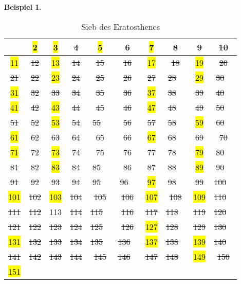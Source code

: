 \documentclass[12pt,a4paper]{article}
\theoremstyle{definition}
\newtheorem{bsp}{Beispiel}[subsection]
\begin{document}
\begin{bsp}
\begin{table}[h]\begin{center}
\begin{tabular}{c|c|c|c|c|c|c|c|c|c}
   & \hl{ 2 }& \hl{ 3 }& \st{ 4 } & \hl{ 5 }& \st{ 6 } & \hl{ 7 }& \st{ 8 } & \st{ 9 } & \st{ 10 } \\
\hline
\hl{ 11 }& \st{ 12 } & \hl{ 13 }& \st{ 14 } & \st{ 15 } & \st{ 16 } & \hl{ 17 }& \st{ 18 } & \hl{ 19 }& \st{ 20 } \\
\hline
\st{ 21 } & \st{ 22 } & \hl{ 23 }& \st{ 24 } & \st{ 25 } & \st{ 26 } & \st{ 27 } & \st{ 28 } & \hl{ 29 }& \st{ 30 } \\
\hline
\hl{ 31 }& \st{ 32 } & \st{ 33 } & \st{ 34 } & \st{ 35 } & \st{ 36 } & \hl{ 37 }& \st{ 38 } & \st{ 39 } & \st{ 40 } \\
\hline
\hl{ 41 }& \st{ 42 } & \hl{ 43 }& \st{ 44 } & \st{ 45 } & \st{ 46 } & \hl{ 47 }& \st{ 48 } & \st{ 49 } & \st{ 50 } \\
\hline
\st{ 51 } & \st{ 52 } & \hl{ 53 }& \st{ 54 } & \st{ 55 } & \st{ 56 } & \st{ 57 } & \st{ 58 } & \hl{ 59 }& \st{ 60 } \\
\hline
\hl{ 61 }& \st{ 62 } & \st{ 63 } & \st{ 64 } & \st{ 65 } & \st{ 66 } & \hl{ 67 }& \st{ 68 } & \st{ 69 } & \st{ 70 } \\
\hline
\hl{ 71 }& \st{ 72 } & \hl{ 73 }& \st{ 74 } & \st{ 75 } & \st{ 76 } & \st{ 77 } & \st{ 78 } & \hl{ 79 }& \st{ 80 } \\
\hline
\st{ 81 } & \st{ 82 } & \hl{ 83 }& \st{ 84 } & \st{ 85 } & \st{ 86 } & \st{ 87 } & \st{ 88 } & \hl{ 89 }& \st{ 90 } \\
\hline
\st{ 91 } & \st{ 92 } & \st{ 93 } & \st{ 94 } & \st{ 95 } & \st{ 96 } & \hl{ 97 }& \st{ 98 } & \st{ 99 } & \st{ 100 } \\
\hline
\hl{ 101 }& \st{ 102 } & \hl{ 103 }& \st{ 104 } & \st{ 105 } & \st{ 106 } & \hl{ 107 }& \st{ 108 } & \hl{ 109 }& \st{ 110 } \\
\hline
\st{ 111 } & \st{ 112 } & 113 & \st{ 114 } & \st{ 115 } & \st{ 116 } & \st{ 117 } & \st{ 118 } & \st{ 119 } & \st{ 120 } \\
\hline
\st{ 121 } & \st{ 122 } & \st{ 123 } & \st{ 124 } & \st{ 125 } & \st{ 126 } & \hl{ 127 }& \st{ 128 } & \st{ 129 } & \st{ 130 } \\
\hline
\hl{ 131 }& \st{ 132 } & \st{ 133 } & \st{ 134 } & \st{ 135 } & \st{ 136 } & \hl{ 137 }& \st{ 138 } & \hl{ 139 }& \st{ 140 } \\
\hline
\st{ 141 } & \st{ 142 } & \st{ 143 } & \st{ 144 } & \st{ 145 } & \st{ 146 } & \st{ 147 } & \st{ 148 } & \hl{ 149 }& \st{ 150 } \\
\hline
\hl{ 151 }& & & & & & & & & \\
\end{tabular}\end{center}
\caption{Sieb des Eratosthenes}
\label{tab:Sieb des Eratosthenes}
\end{table}


\end{bsp}
\end{document}
